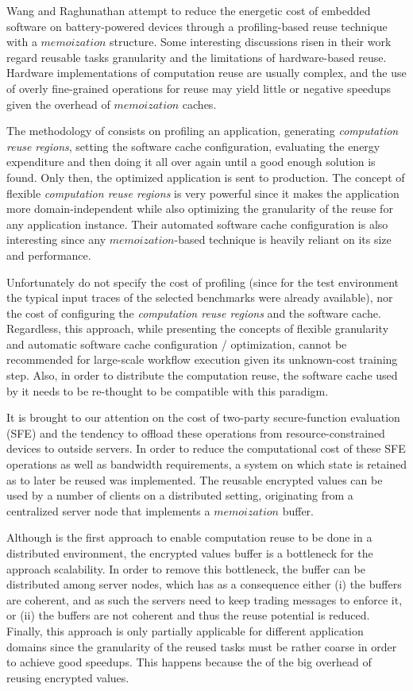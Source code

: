 Wang and Raghunathan \cite{reuse4} attempt to reduce the energetic cost of embedded software on battery-powered devices through a profiling-based reuse technique with a $memoization$ structure. Some interesting discussions risen in their work regard reusable tasks granularity and the limitations of hardware-based reuse. Hardware implementations of computation reuse are usually complex, and the use of overly fine-grained operations for reuse may yield little or negative speedups given the overhead of $memoization$ caches.

The methodology of \cite{reuse4} consists on profiling an application, generating \textit{computation reuse regions}, setting the software cache configuration, evaluating the energy expenditure and then doing it all over again until a good enough solution is found. Only then, the optimized application is sent to production. The concept of flexible \textit{computation reuse regions} is very powerful since it makes the application more domain-independent while also optimizing the granularity of the reuse for any application instance. Their automated software cache configuration is also interesting since any $memoization$-based technique is heavily reliant on its size and performance.

Unfortunately \cite{reuse4} do not specify the cost of profiling (since for the test environment the typical input traces of the selected benchmarks were already available), nor the cost of configuring the \textit{computation reuse regions} and the software cache. Regardless, this approach, while presenting the concepts of flexible granularity and automatic software cache configuration / optimization, cannot be recommended for large-scale workflow execution given its unknown-cost training step. Also, in order to distribute the computation reuse, the software cache used by it needs to be re-thought to be compatible with this paradigm.

It is brought to our attention on \cite{reuse5} the cost of two-party secure-function evaluation (SFE) and the tendency to offload these operations from resource-constrained devices to outside servers. In order to reduce the computational cost of these SFE operations as well as bandwidth requirements, a system on which state is retained as to later be reused was implemented. The reusable encrypted values can be used by a number of clients on a distributed setting, originating from a centralized server node that implements a $memoization$ buffer.

Although \cite{reuse5} is the first approach to enable computation reuse to be done in a distributed environment, the encrypted values buffer is a bottleneck for the approach scalability. In order to remove this bottleneck, the buffer can be distributed among server nodes, which has as a consequence either (i) the buffers are coherent, and as such the servers need to keep trading messages to enforce it, or (ii) the buffers are not coherent and thus the reuse potential is reduced. Finally, this approach is only partially applicable for different application domains since the granularity of the reused tasks must be rather coarse in order to achieve good speedups. This happens because the of the big overhead of reusing encrypted values.

